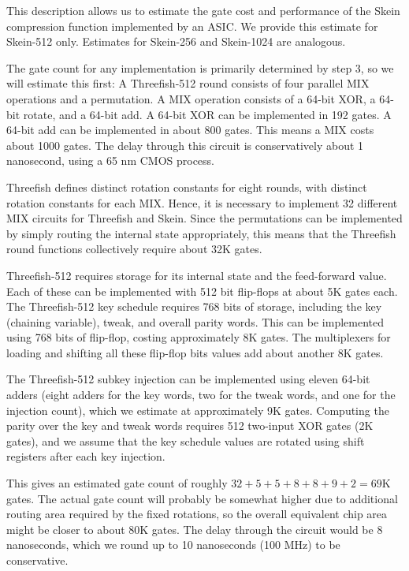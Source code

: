 \documentclass[11pt,twoside]{article}
\begin{document}
This description allows us to estimate the gate cost and performance of the Skein compression function implemented by an ASIC. We provide this estimate for Skein-512 only. Estimates for Skein-256 and Skein-1024 are analogous.

The gate count for any implementation is primarily determined by step 3, so we will estimate this first:  A Threefish-512 round consists of four parallel MIX operations and a permutation. A MIX operation consists of a 64-bit XOR, a 64-bit rotate, and a 64-bit add. A 64-bit XOR can be implemented in 192 gates. A 64-bit add can be implemented in about 800 gates. This means a MIX costs about 1000 gates. The delay through this circuit is conservatively about 1 nanosecond, using a 65 nm CMOS process.

Threefish defines distinct rotation constants for eight rounds, with distinct rotation constants for each MIX. Hence, it is necessary to implement 32 different MIX circuits for Threefish and Skein. Since the permutations can be implemented by simply routing the internal state appropriately, this means that the Threefish round functions collectively require about 32K gates.

Threefish-512 requires storage for its internal state and the feed-forward value. Each of these can be implemented with 512 bit flip-flops at about 5K gates each. The Threefish-512 key schedule requires 768 bits of storage, including the key (chaining variable), tweak, and overall parity words. This can be implemented using 768 bits of flip-flop, costing approximately 8K gates. The multiplexers for loading and shifting all these flip-flop bits values add about another 8K gates.

The Threefish-512 subkey injection can be implemented using eleven 64-bit adders (eight adders for the key words, two for the tweak words, and one for the injection count), which we estimate at approximately 9K gates. Computing the parity over the key and tweak words requires 512 two-input XOR gates (2K gates), and we assume that the key schedule values are rotated using shift registers after each key injection.

This gives an estimated gate count of roughly $32+5+5+8+8+9+2 = 69$K gates. The actual gate count will probably be somewhat higher due to additional routing area required by the fixed rotations, so the overall equivalent chip area might be closer to about 80K gates. The delay through the circuit would be 8 nanoseconds, which we round up to 10 nanoseconds (100 MHz) to be conservative.
\end{document}
